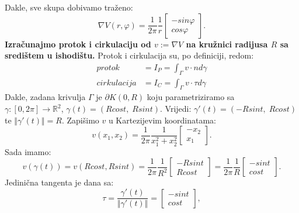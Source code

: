 \documentclass[a4paper,oneside,12pt]{memoir} %
\begin{document}
Dakle, sve skupa dobivamo traženo:
\begin{equation*}
\nabla V(r,\varphi) = \frac{1}{2 \pi} \frac{1}{r} \begin{bmatrix}
   												      -sin \varphi \\
 											           cos \varphi
  											      \end{bmatrix}.
\end{equation*}
$ $\\
$ $\\
\textbf{Izračunajmo protok i cirkulaciju od $v:=\nabla V$ na kružnici radijusa $R$ sa središtem u ishodištu.} Protok i cirkulacija su, po definiciji, redom:
\begin{align*}
protok &= I_P = \int_\Gamma v \cdot n d\gamma \\
cirkulacija &= I_C = \int_\Gamma v \cdot \tau d\gamma
\end{align*}
Dakle, zadana krivulja $\Gamma$ je $\partial K(0,R)$  koju parametriziramo sa \\
$\gamma : [0, 2\pi] \rightarrow \mathbb{R}^2$, \; $\gamma(t) = (Rcost,\; Rsint)$. Vrijedi: $\gamma'(t) = (-Rsint, \; Rcost)$ te $\Vert \gamma'(t) \Vert = R$.
Zapišimo $v$ u Kartezijevim koordinatama:
\begin{equation*}
v(x_1,x_2) = \frac{1}{2\pi}\frac{1}{x_1^2+x_2^2} \begin{bmatrix}
   												      -x_2 \\
 											           x_1
  											      \end{bmatrix}.
\end{equation*}
Sada imamo:
\begin{equation*}
v(\gamma(t)) = v(Rcost, Rsint) = \frac{1}{2\pi}\frac{1}{R^2} \begin{bmatrix}
   												  		       -Rsint \\
 											      		        Rcost
  											    		     \end{bmatrix} 
  							   = \frac{1}{2\pi}\frac{1}{R} \begin{bmatrix}
   												     		   -sint \\
 											        		    cost
  											   			   \end{bmatrix}.
\end{equation*}
Jedinična tangenta je dana sa:
\begin{equation*}
\tau = \frac{\gamma'(t)}{\Vert \gamma'(t) \Vert} = \begin{bmatrix}
   												       -sint \\
 											        	cost
  											   		\end{bmatrix},
\end{equation*}
\end{document}
